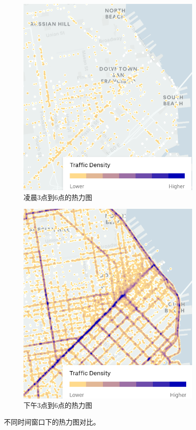 \begin{itemize}[leftmargin=*]
	\begin{figure}[h!]
		\centering
		\begin{subfigure}{0.45\linewidth}
			\centering
			\includegraphics[width=0.8\linewidth]{figures/3a-6a-2020q1-RoadHeatmap-sanfrancisc.png}
			\caption{凌晨3点到6点的热力图}
			\label{subfig:morning_heatmap}
		\end{subfigure}
		\hspace{1em}
		\begin{subfigure}{0.45\linewidth}
			\centering
			\includegraphics[width=0.8\linewidth]{figures/3p-6p-2020q1-RoadHeatmap-sanfrancisc.png}
			\caption{下午3点到6点的热力图}
			\label{subfig:afternoon_heatmap}
		\end{subfigure}
		\caption{不同时间窗口下的热力图对比。}
		\label{fig:temporal_heatmap}
	\end{figure}
	

\end{itemize}
